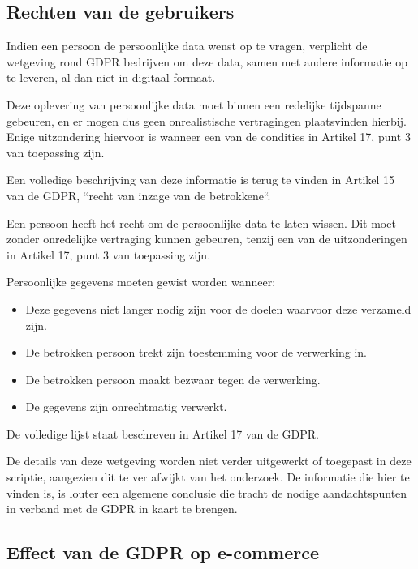 \subsection{Rechten van de gebruikers}
\label{subsec: Rechten van de gebruikers}

Indien een persoon de persoonlijke data wenst op te vragen, verplicht de wetgeving rond GDPR  bedrijven om deze data, samen met andere informatie op te leveren, al dan niet in digitaal formaat.

Deze oplevering van persoonlijke data moet binnen een redelijke tijdspanne gebeuren, en er mogen dus geen onrealistische vertragingen plaatsvinden hierbij. Enige uitzondering hiervoor is wanneer een van de condities in Artikel 17, punt 3 van toepassing zijn. 

 Een volledige beschrijving van deze informatie is terug te vinden in Artikel 15 van de GDPR, ``recht van inzage van de betrokkene``. \autocite{Article15GDPR2018}

Een persoon heeft het recht om de persoonlijke data te laten wissen. Dit moet zonder onredelijke vertraging kunnen gebeuren, tenzij een van de uitzonderingen in Artikel 17, punt 3 van toepassing zijn.

Persoonlijke gegevens moeten gewist worden wanneer: 

\begin{itemize}
	\item Deze gegevens niet langer nodig zijn voor de doelen waarvoor deze verzameld zijn.
	\item De betrokken persoon trekt zijn toestemming voor de verwerking in.
	\item De betrokken persoon maakt bezwaar tegen de verwerking.
	\item De gegevens zijn onrechtmatig verwerkt.
\end{itemize}
\autocite{Article17GDPR2018}

De volledige lijst staat beschreven in Artikel 17 van de GDPR.

De details van deze wetgeving worden niet verder uitgewerkt of toegepast in deze scriptie, aangezien dit te ver afwijkt van het onderzoek. De informatie die hier te vinden is, is louter een algemene conclusie die tracht de nodige aandachtspunten in verband met de GDPR in kaart te brengen.

\subsection{Effect van de GDPR op e-commerce}
\label{subsec: Effect van de GDPR op e-commerce}

